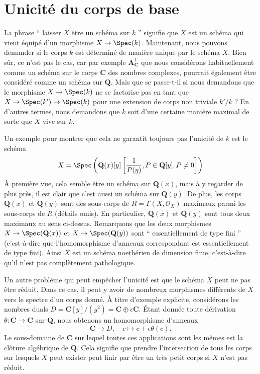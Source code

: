 \section{Unicité du corps de base}
\label{section-base-field}

\noindent
La phrase `` laisser $X$ être un schéma sur $k$ '' signifie que $X$
est un schéma qui vient équipé d'un morphisme $X \to \Spec(k)$.
Maintenant, nous pouvons demander si le corps $k$ est déterminé de
manière unique par le schéma $X$. Bien sûr, ce n'est pas le cas, car par
exemple $\mathbf{A}^1_{\mathbf{C}}$ que nous considérons habituellement
comme un schéma sur le corps $\mathbf{C}$ des nombres complexes,
pourrait également être considéré comme un schéma sur $\mathbf{Q}$. Mais
que se passe-t-il si nous demandons que le morphisme $X \to \Spec(k)$ ne
se factorise pas en tant que $X \to \Spec(k') \to \Spec(k)$ pour une
extension de corps non triviale $k'/k$ ? En d'autres termes, nous demandons
que $k$ soit d'une certaine manière maximal de sorte que $X$ vive sur $k$.

\medskip\noindent
Un exemple pour montrer que cela ne garantit
toujours pas l'unicité de $k$ est le schéma
$$
X =
\Spec\left(
\mathbf{Q}(x)[y]\left[\frac{1}{P(y)}, P \in \mathbf{Q}[y], P \not = 0\right]
\right)
$$
À première vue, cela semble être un schéma sur $\mathbf{Q}(x)$, mais
à y regarder de plus près, il est clair que c'est aussi un schéma
sur $\mathbf{Q}(y)$. De plus, les corps $\mathbf{Q}(x)$ et
$\mathbf{Q}(y)$ sont des sous-corps de $R = \Gamma(X, \mathcal{O}_X)$
maximaux parmi les sous-corps de $R$ (détails omis). En particulier,
$\mathbf{Q}(x)$ et $\mathbf{Q}(y)$ sont tous deux maximaux au sens
ci-dessus. Remarquons que les deux morphismes $X \to
\Spec(\mathbf{Q}(x))$ et $X \to \Spec(\mathbf{Q}(y))$ sont ``
essentiellement de type fini '' (c'est-à-dire que l'homomorphisme d'anneaux
correspondant est essentiellement de type fini). Ainsi $X$ est un schéma
noethérien de dimension finie, c'est-à-dire qu'il n'est pas complètement pathologique.

\medskip\noindent
Un autre problème qui peut empêcher l'unicité est que le schéma
$X$ peut ne pas être réduit. Dans ce cas, il peut y avoir de
nombreux morphismes différents de $X$ vers le spectre d'un corps
donné. À titre d'exemple explicite, considérons les nombres
duals $D = \mathbf{C}[y]/(y^2) = \mathbf{C} \oplus \epsilon
\mathbf{C}$. Étant donnée toute dérivation $\theta : \mathbf{C} \to
\mathbf{C}$ sur $\mathbf{Q}$, nous obtenons un homomorphisme d'anneaux
$$
\mathbf{C} \longrightarrow D, \quad
c \longmapsto c + \epsilon \theta(c).
$$
Le sous-domaine de $\mathbf{C}$ sur lequel toutes ces applications
sont les mêmes est la clôture algébrique de $\mathbf{Q}$. Cela
signifie que prendre l'intersection de tous les corps sur lesquels $X$
peut exister peut finir par être un très petit corps si $X$ n'est pas réduit.

